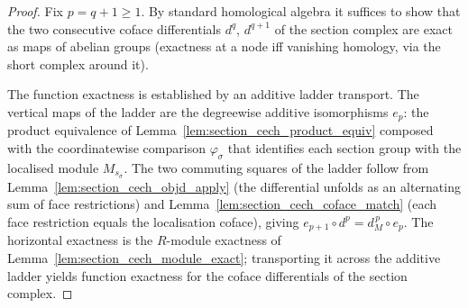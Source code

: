 \begin{proof}
  Fix \(p = q + 1 \geq 1\). By standard homological algebra it suffices to show that
  the two consecutive coface differentials \(d^q\), \(d^{q+1}\) of the section
  complex are exact as maps of abelian groups (exactness at a node iff vanishing
  homology, via the short complex around it).

  The function exactness is established by an additive ladder transport. The
  vertical maps of the ladder are the degreewise additive isomorphisms
  \(e_p\): the product equivalence of Lemma~\ref{lem:section_cech_product_equiv}
  composed with the coordinatewise comparison \(\varphi_\sigma\) that identifies
  each section group with the localised module \(M_{s_\sigma}\). The two
  commuting squares of the ladder follow from
  Lemma~\ref{lem:section_cech_objd_apply} (the differential unfolds as an
  alternating sum of face restrictions) and Lemma~\ref{lem:section_cech_coface_match}
  (each face restriction equals the localisation coface), giving
  \(e_{p+1} \circ d^p = d_M^{\,p} \circ e_p\). The horizontal exactness is
  the \(R\)-module exactness of Lemma~\ref{lem:section_cech_module_exact};
  transporting it across the additive ladder yields function exactness for the
  coface differentials of the section complex.
\end{proof}

